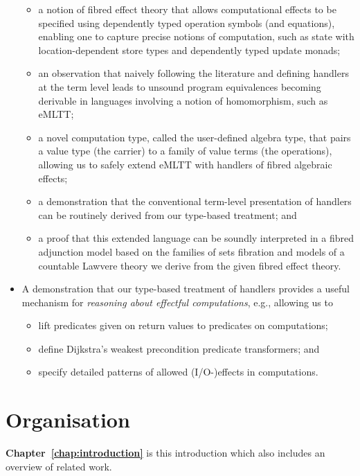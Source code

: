 \begin{itemize}
\begin{itemize}
\item a notion of fibred effect theory that allows computational effects to be specified using dependently typed operation symbols (and equations), enabling one to capture precise notions of computation, such as state with location-dependent store types and dependently typed update monads;
\item an observation that naively following the literature and defining handlers at the term level leads to unsound program equivalences becoming derivable in languages involving a notion of homomorphism, such as eMLTT;
\item a novel computation type, called the user-defined algebra type, that pairs a value type (the carrier) to a family of value terms (the operations), allowing us to safely extend eMLTT with handlers of fibred algebraic effects;
\item a demonstration that the conventional term-level presentation of handlers can be routinely derived from our type-based treatment; and
\item a proof that this extended language can be soundly interpreted in a fibred adjunction model based on the families of sets fibration and models of a countable Lawvere theory we derive from the given fibred effect theory.
\end{itemize}
\item A demonstration that our type-based treatment of handlers provides a useful mechanism for \emph{reasoning about effectful computations}, e.g., allowing us to 
\begin{itemize}
\item lift predicates given on return values to predicates on computations; 
\item define Dijkstra's weakest precondition predicate transformers; and 
\item specify detailed patterns of allowed (I/O-)effects in computations. 
\end{itemize}
\end{itemize}


\section{Organisation}

\noindent
\textbf{Chapter~\ref{chap:introduction}} is this introduction which also includes an overview of related work.

\vspace{0.05cm}

